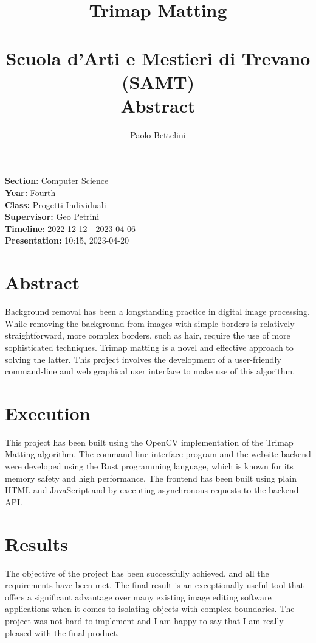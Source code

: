 \documentclass[a4paper]{article}
\title{%
    Trimap Matting \\
    \phantom{} \\
    \large Scuola d'Arti e Mestieri di Trevano (SAMT) \\
    \large Abstract
}
\author{Paolo Bettelini}
\date{}
\begin{document}
\maketitle

\vspace{2cm}

\textbf{Section}: Computer Science \\
\textbf{Year:} Fourth \\
\textbf{Class:} Progetti Individuali \\
\textbf{Supervisor:} Geo Petrini \\
\textbf{Timeline}: 2022-12-12 - 2023-04-06 \\
\textbf{Presentation:} 10:15, 2023-04-20

\vspace{2cm}

\thispagestyle{empty} %

\section*{Abstract}

Background removal has been a longstanding practice in digital image processing.
While removing the background from images with simple borders is relatively straightforward,
more complex borders, such as hair, require the use of more sophisticated techniques.
Trimap matting is a novel and effective approach to solving the latter.
This project involves the development of a user-friendly command-line and web graphical user interface
to make use of this algorithm.

\section*{Execution}

This project has been built using the OpenCV implementation of the Trimap Matting algorithm.
The command-line interface program and the website backend were developed using the Rust programming
language, which is known for its memory safety and high performance.
The frontend has been built using plain HTML and JavaScript and by
executing asynchronous requests to the backend API.

\section*{Results}

The objective of the project has been successfully achieved, and all the requirements have been met.
The final result is an exceptionally useful tool that offers a significant
advantage over many existing image editing software applications when it comes
to isolating objects with complex boundaries.
The project was not hard to implement and I am happy to say that
I am really pleased with the final product.
\end{document}
